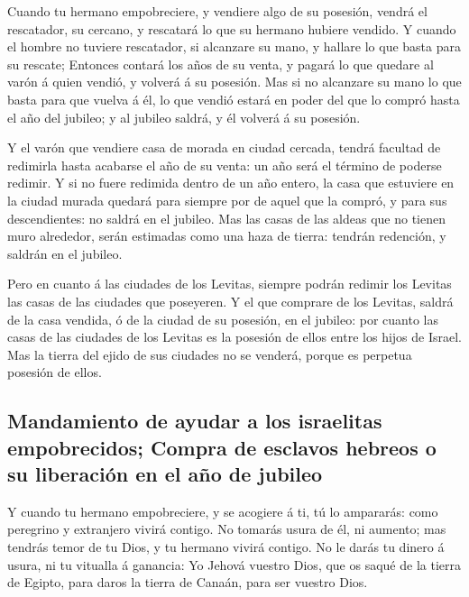  Cuando tu hermano empobreciere, y vendiere algo de su
posesión, vendrá el rescatador, su cercano, y rescatará lo que su
hermano hubiere vendido.  Y cuando el hombre no tuviere
rescatador, si alcanzare su mano, y hallare lo que basta para su
rescate;  Entonces contará los años de su venta, y pagará
lo que quedare al varón á quien vendió, y volverá á su posesión.
 Mas si no alcanzare su mano lo que basta para que vuelva á
él, lo que vendió estará en poder del que lo compró hasta el año del
jubileo; y al jubileo saldrá, y él volverá á su posesión.

 Y el varón que vendiere casa de morada en ciudad cercada,
tendrá facultad de redimirla hasta acabarse el año de su venta: un año
será el término de poderse redimir.  Y si no fuere redimida
dentro de un año entero, la casa que estuviere en la ciudad murada
quedará para siempre por de aquel que la compró, y para sus
descendientes: no saldrá en el jubileo.  Mas las casas de
las aldeas que no tienen muro alrededor, serán estimadas como una haza
de tierra: tendrán redención, y saldrán en el jubileo.

 Pero en cuanto á las ciudades de los Levitas, siempre
podrán redimir los Levitas las casas de las ciudades que poseyeren.
 Y el que comprare de los Levitas, saldrá de la casa
vendida, ó de la ciudad de su posesión, en el jubileo: por cuanto las
casas de las ciudades de los Levitas es la posesión de ellos entre los
hijos de Israel.  Mas la tierra del ejido de sus ciudades
no se venderá, porque es perpetua posesión de ellos.

\hypertarget{mandamiento-de-ayudar-a-los-israelitas-empobrecidos-compra-de-esclavos-hebreos-o-su-liberaciuxf3n-en-el-auxf1o-de-jubileo}{%
\subsection{Mandamiento de ayudar a los israelitas empobrecidos; Compra
de esclavos hebreos o su liberación en el año de
jubileo}\label{mandamiento-de-ayudar-a-los-israelitas-empobrecidos-compra-de-esclavos-hebreos-o-su-liberaciuxf3n-en-el-auxf1o-de-jubileo}}

 Y cuando tu hermano empobreciere, y se acogiere á ti, tú
lo ampararás: como peregrino y extranjero vivirá contigo. 
No tomarás usura de él, ni aumento; mas tendrás temor de tu Dios, y tu
hermano vivirá contigo.  No le darás tu dinero á usura, ni
tu vitualla á ganancia:  Yo Jehová vuestro Dios, que os
saqué de la tierra de Egipto, para daros la tierra de Canaán, para ser
vuestro Dios.

